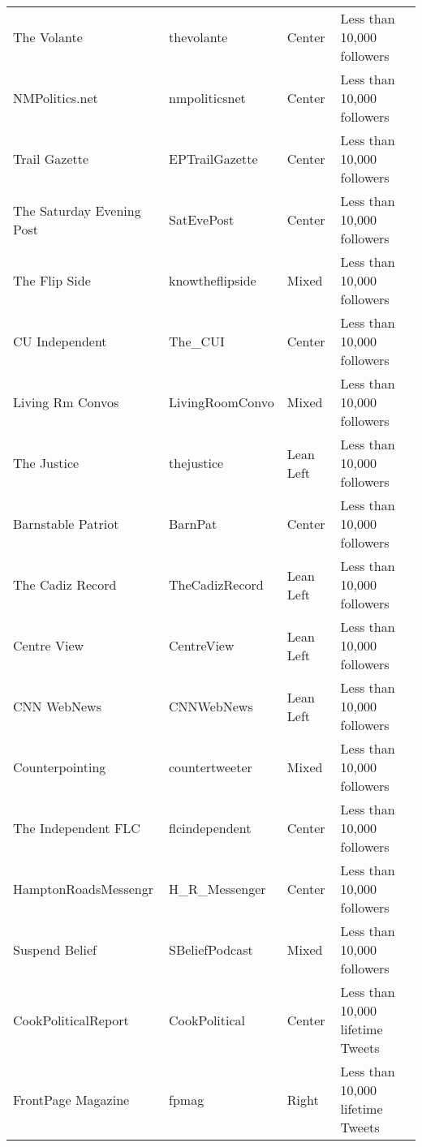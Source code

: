 \begin{tabular}{llll}
                 The Volante &       thevolante &        Center &                Less than 10,000 followers \\
              NMPolitics.net &    nmpoliticsnet &        Center &                Less than 10,000 followers \\
               Trail Gazette &   EPTrailGazette &        Center &                Less than 10,000 followers \\
   The Saturday Evening Post &       SatEvePost &        Center &                Less than 10,000 followers \\
               The Flip Side &  knowtheflipside &         Mixed &                Less than 10,000 followers \\
              CU Independent &          The\_CUI &        Center &                Less than 10,000 followers \\
            Living Rm Convos &  LivingRoomConvo &         Mixed &                Less than 10,000 followers \\
                 The Justice &       thejustice &     Lean Left &                Less than 10,000 followers \\
          Barnstable Patriot &          BarnPat &        Center &                Less than 10,000 followers \\
            The Cadiz Record &   TheCadizRecord &     Lean Left &                Less than 10,000 followers \\
                 Centre View &       CentreView &     Lean Left &                Less than 10,000 followers \\
                 CNN WebNews &       CNNWebNews &     Lean Left &                Less than 10,000 followers \\
             Counterpointing &   countertweeter &         Mixed &                Less than 10,000 followers \\
         The Independent FLC &   flcindependent &        Center &                Less than 10,000 followers \\
        HamptonRoadsMessengr &    H\_R\_Messenger &        Center &                Less than 10,000 followers \\
              Suspend Belief &   SBeliefPodcast &         Mixed &                Less than 10,000 followers \\
         CookPoliticalReport &    CookPolitical &        Center &          Less than 10,000 lifetime Tweets \\
          FrontPage Magazine &            fpmag &         Right &          Less than 10,000 lifetime Tweets \\

\end{tabular}
